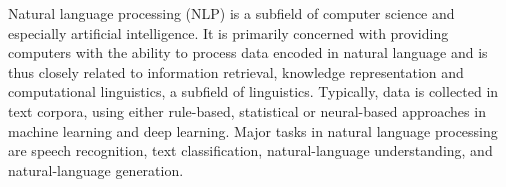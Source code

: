 \cite{AWSNLP:1}Natural language processing (NLP) is a subfield of computer science and especially artificial intelligence. It is primarily concerned with providing computers with the ability to process data encoded in natural language and is thus closely related to information retrieval, knowledge representation and computational linguistics, a subfield of linguistics. Typically, data is collected in text corpora, using either rule-based, statistical or neural-based approaches in machine learning and deep learning. Major tasks in natural language processing are speech recognition, text classification, natural-language understanding, and natural-language generation.
